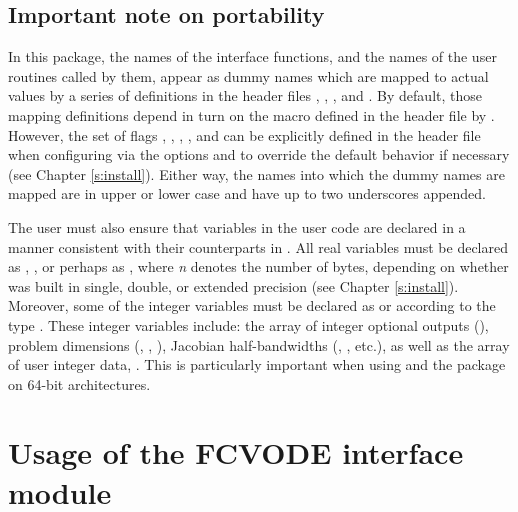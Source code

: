 \subsection{Important note on portability}

In this package, the names of the interface functions, and the names of
the {\F} user routines called by them, appear as dummy names
which are mapped to actual values by a series of definitions in the
header files , , , and .
By default, those mapping definitions depend in turn on the {\C} macro
 defined in the header file  by . However,
the set of flags , ,
, , and
 can be explicitly defined in the header file
 when
configuring {\sundials} via the options  and
 to override the default behavior if necessary
(see Chapter \ref{s:install}). Either way, the names into which the dummy names
are mapped are in upper or lower case and have up to two underscores appended.

The user must also ensure that variables in the user {\F} code are
declared in a manner consistent with their counterparts in {\cvode}.
All real variables must be declared as , ,
or perhaps as , where {\em n} denotes the number of bytes,
depending on whether {\cvode} was built in single, double, or extended precision 
(see Chapter \ref{s:install}). Moreover, some of the {\F} integer variables
must be declared as  or  according to the 
{\C} type . These integer variables include: the array
of integer optional outputs (), problem dimensions (,
, ), Jacobian half-bandwidths (, ,
etc.), as well as the array of user integer data, .
This is particularly important when using {\cvode} and the {\fcvode} package 
on 64-bit architectures.


\section{Usage of the FCVODE interface module}\label{ss:fcvode_usage}

